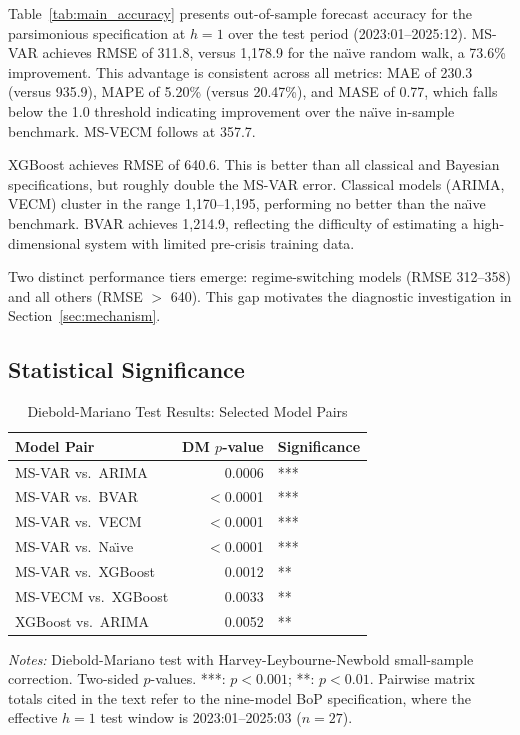\documentclass[12pt,a4paper]{article}
\begin{document}
Table~\ref{tab:main_accuracy} presents out-of-sample forecast accuracy for the parsimonious specification at $h=1$ over the test period (2023:01--2025:12). MS-VAR achieves RMSE of 311.8, versus 1,178.9 for the na\"{\i}ve random walk, a 73.6\% improvement. This advantage is consistent across all metrics: MAE of 230.3 (versus 935.9), MAPE of 5.20\% (versus 20.47\%), and MASE of 0.77, which falls below the 1.0 threshold indicating improvement over the na\"{\i}ve in-sample benchmark. MS-VECM follows at 357.7.

XGBoost achieves RMSE of 640.6. This is better than all classical and Bayesian specifications, but roughly double the MS-VAR error. Classical models (ARIMA, VECM) cluster in the range 1,170--1,195, performing no better than the na\"{\i}ve benchmark. BVAR achieves 1,214.9, reflecting the difficulty of estimating a high-dimensional system with limited pre-crisis training data.

Two distinct performance tiers emerge: regime-switching models (RMSE 312--358) and all others (RMSE $>$ 640). This gap motivates the diagnostic investigation in Section~\ref{sec:mechanism}.

\subsection{Statistical Significance}
\label{sec:stat_tests}

\begin{table}[htbp]
\centering
\caption{Diebold-Mariano Test Results: Selected Model Pairs}
\label{tab:dm_tests}
\begin{tabular}{lrl}
\toprule
Model Pair & DM $p$-value & Significance \\
\midrule
MS-VAR vs.\ ARIMA & 0.0006 & *** \\
MS-VAR vs.\ BVAR & $<$0.0001 & *** \\
MS-VAR vs.\ VECM & $<$0.0001 & *** \\
MS-VAR vs.\ Na\"{\i}ve & $<$0.0001 & *** \\
MS-VAR vs.\ XGBoost & 0.0012 & ** \\
MS-VECM vs.\ XGBoost & 0.0033 & ** \\
XGBoost vs.\ ARIMA & 0.0052 & ** \\
\bottomrule
\end{tabular}
\begin{tablenotes}
\small
\item \textit{Notes:} Diebold-Mariano test with Harvey-Leybourne-Newbold small-sample correction. Two-sided $p$-values. ***: $p < 0.001$; **: $p < 0.01$. Pairwise matrix totals cited in the text refer to the nine-model BoP specification, where the effective $h=1$ test window is 2023:01--2025:03 ($n=27$).
\end{tablenotes}
\end{table}
\end{document}
